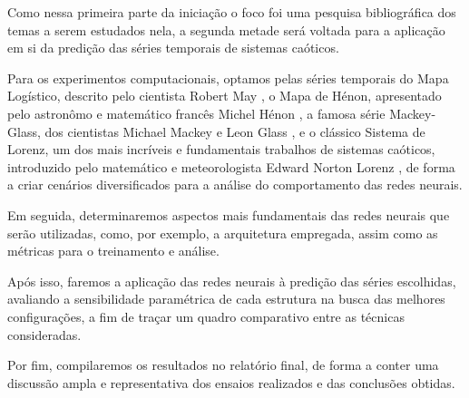\documentclass[a4paper, 12pt]{article}
\begin{document}
Como nessa primeira parte da iniciação o foco foi uma pesquisa bibliográfica dos temas a serem estudados nela, a segunda metade será voltada para a aplicação em si da predição das séries temporais de sistemas caóticos.

Para os experimentos computacionais, optamos pelas séries temporais do Mapa Logístico, descrito pelo cientista Robert May \cite{may1976simple}, o Mapa de Hénon, apresentado pelo astronômo e matemático francês Michel Hénon \cite{henon1976two}, a famosa série Mackey-Glass, dos cientistas Michael Mackey e Leon Glass \cite{mackey1977oscillation}, e o clássico Sistema de Lorenz, um dos  mais incríveis e fundamentais trabalhos de sistemas caóticos, introduzido pelo matemático e meteorologista Edward Norton Lorenz \cite{lorenz1963deterministic}, de forma a criar cenários diversificados para a análise do comportamento das redes neurais.

Em seguida, determinaremos aspectos mais fundamentais das redes neurais que serão utilizadas, como, por exemplo, a arquitetura empregada, assim como as métricas para o treinamento e análise.

Após isso, faremos a aplicação das redes neurais à predição das séries escolhidas, avaliando a sensibilidade paramétrica de cada estrutura na busca das melhores configurações, a fim de traçar um quadro comparativo entre as técnicas consideradas. 

Por fim, compilaremos os resultados no relatório final, de forma a conter uma discussão ampla e representativa dos ensaios realizados e das conclusões obtidas. 




\end{document}
